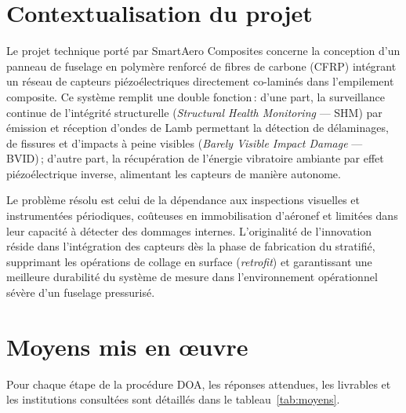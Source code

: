 \documentclass[12pt,a4paper]{article}
\begin{document}
\section{Contextualisation du projet}

Le projet technique porté par SmartAero Composites concerne la conception d'un panneau de fuselage en polymère renforcé de fibres de carbone (CFRP) intégrant un réseau de capteurs piézoélectriques directement co-laminés dans l'empilement composite. Ce système remplit une double fonction\,: d'une part, la surveillance continue de l'intégrité structurelle (\textit{Structural Health Monitoring} --- SHM) par émission et réception d'ondes de Lamb permettant la détection de délaminages, de fissures et d'impacts à peine visibles (\textit{Barely Visible Impact Damage} --- BVID)\,; d'autre part, la récupération de l'énergie vibratoire ambiante par effet piézoélectrique inverse, alimentant les capteurs de manière autonome.

Le problème résolu est celui de la dépendance aux inspections visuelles et instrumentées périodiques, coûteuses en immobilisation d'aéronef et limitées dans leur capacité à détecter des dommages internes. L'originalité de l'innovation réside dans l'intégration des capteurs dès la phase de fabrication du stratifié, supprimant les opérations de collage en surface (\textit{retrofit}) et garantissant une meilleure durabilité du système de mesure dans l'environnement opérationnel sévère d'un fuselage pressurisé.

\section{Moyens mis en \oe uvre}

Pour chaque étape de la procédure DOA, les réponses attendues, les livrables et les institutions consultées sont détaillés dans le tableau~\ref{tab:moyens}.
\end{document}
